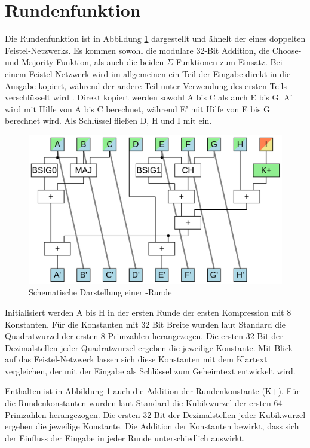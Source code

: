 \section{Rundenfunktion}
\label{sec:sha256:runde}

Die Rundenfunktion ist in Abbildung \ref{fig:sha256core} dargestellt und ähnelt der eines doppelten Feistel-Netzwerks.
Es kommen sowohl die modulare 32-Bit Addition, die Choose- und Majority-Funktion, als auch die beiden $\Sigma$-Funktionen zum Einsatz.
Bei einem Feistel-Netzwerk wird im allgemeinen ein Teil der Eingabe direkt in die Ausgabe kopiert, während der andere
Teil unter Verwendung des ersten Teils verschlüsselt wird \cite[311]{crypto1}. Direkt kopiert werden sowohl A bis C
als auch E bis G. A' wird mit Hilfe von A bis C berechnet, während E' mit Hilfe von E bis G berechnet wird.
Als Schlüssel fließen D, H und I mit ein.

\begin{figure}[!h]
  \centering
  \includegraphics[scale=0.4]{images/sha256core}
  \caption{Schematische Darstellung einer -Runde}
  \label{fig:sha256core}
\end{figure}

Initialisiert werden A bis H in der ersten Runde der ersten Kompression mit 8 Konstanten. Für die Konstanten mit 32 Bit Breite wurden laut
Standard \cite[10]{nist1804} die Quadratwurzel der ersten 8 Primzahlen herangezogen. Die ersten 32 Bit der Dezimalstellen jeder Quadratwurzel
ergeben die jeweilige Konstante. Mit Blick auf das Feistel-Netzwerk lassen sich diese Konstanten mit dem Klartext vergleichen, der mit der
Eingabe als Schlüssel zum Geheimtext entwickelt wird.

Enthalten ist in Abbildung \ref{fig:sha256core} auch die Addition der Rundenkonstante (K+). Für die Rundenkonstanten wurden laut Standard
\cite[10]{nist1804} die Kubikwurzel der ersten 64 Primzahlen herangezogen. Die ersten 32 Bit der Dezimalstellen jeder Kubikwurzel ergeben
die jeweilige Konstante. Die Addition der Konstanten bewirkt, dass sich der Einfluss der Eingabe in jeder Runde unterschiedlich auswirkt.